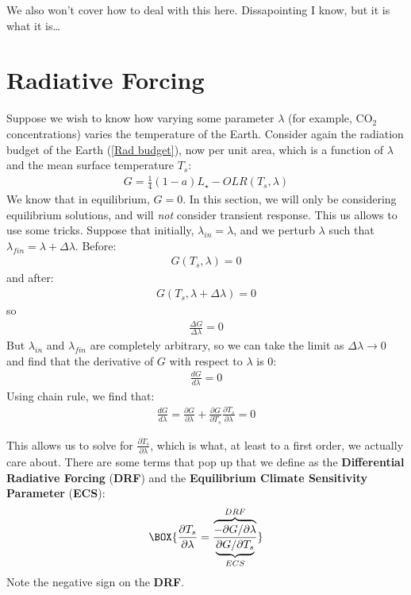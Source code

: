 We also won't cover how to deal with this here. Dissapointing I know, but it is what it is\ldots

\section{Radiative Forcing}

Suppose we wish to know how varying some parameter $\lambda$ (for example, CO$_2$ concentrations) varies the temperature of the Earth. Consider again the radiation budget of the Earth (\ref{Rad budget}), now per unit area, which is a function of $\lambda$ and the mean surface temperature $T_s$:
\begin{align}
    G=\frac{1}{4}(1-a)L_\star-OLR(T_s,\lambda)
\end{align}
We know that in equilibrium, $G=0$. In this section, we will only be considering equilibrium solutions, and will \textit{not} consider transient response. This us allows to use some tricks. Suppose that initially, $\lambda_{in}=\lambda$, and we perturb $\lambda$ such that $\lambda_{fin}=\lambda+\Delta \lambda$. Before:
\begin{align*}
    G(T_s,\lambda)=0
\end{align*}
and after:
\begin{align*}
    G(T_s,\lambda+\Delta \lambda)=0
\end{align*}
so
\begin{align*}
    \frac{\Delta G}{\Delta \lambda}=0
\end{align*}
But $\lambda_{in}$ and $\lambda_{fin}$ are completely arbitrary, so we can take the limit as $\Delta\lambda\to 0$ and find that the derivative of $G$ with respect to $\lambda$ is 0:
\begin{align*}
    \frac{dG}{d\lambda}=0
\end{align*}
Using chain rule, we find that:
\begin{align*}
    \frac{dG}{d\lambda}=\frac{\partial G}{\partial \lambda}+\frac{\partial G}{\partial T_s}\frac{\partial T_s}{\partial \lambda}=0
\end{align*}

This allows us to solve for $\frac{\partial T_s}{\partial \lambda}$, which is what, at least to a first order, we actually care about. There are some terms that pop up that we define as the \textbf{Differential Radiative Forcing} (\textbf{DRF}) and the \textbf{Equilibrium Climate Sensitivity Parameter} (\textbf{ECS}):
\begin{align}
    \label{DRF and ECS}
    \BOX{
        \frac{\partial T_s}{\partial \lambda}=
        \frac{\overbrace{-\partial G/\partial \lambda}^{DRF}}{\underbrace{\partial G/\partial T_s}_{ECS}}
    }
\end{align}
Note the negative sign on the \textbf{DRF}.

